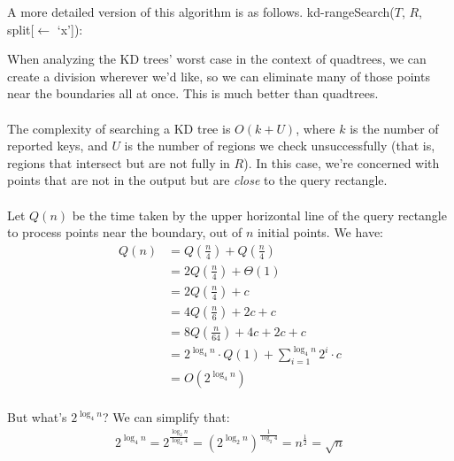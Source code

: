\documentclass[]{article}
\theoremstyle{definition}
\begin{document}
			A more detailed version of this algorithm is as follows. kd-rangeSearch($T$, $R$, split[$\leftarrow$ `x']): \\
			\begin{algorithm}[H]
			\end{algorithm}

			When analyzing the KD trees' worst case in the context of quadtrees, we can create a division wherever we'd like, so we can eliminate many of those points near the boundaries all at once. This is much better than quadtrees.
			\\ \\
			The complexity of searching a KD tree is $O(k + U)$, where $k$ is the number of reported keys, and $U$ is the number of regions we check unsuccessfully (that is, regions that intersect but are not fully in $R$). In this case, we're concerned with points that are not in the output but are \emph{close} to the query rectangle.
			\\ \\
			Let $Q(n)$ be the time taken by the upper horizontal line of the query rectangle to process points near the boundary, out of $n$ initial points. We have:
			\begin{align*}
				Q(n) &= Q\left( \frac{n}{4} \right) + Q\left( \frac{n}{4} \right) \\
				&= 2Q\left( \frac{n}{4} \right) + \Theta(1) \\
				&= 2Q\left( \frac{n}{4} \right) + c \\
				&= 4Q\left( \frac{n}{6} \right) + 2c + c \\
				&= 8Q\left( \frac{n}{64} \right) + 4c + 2c + c \\
				&= 2^{\log_4 n} \cdot Q(1) + \sum_{i = 1}^{\log_4 n} 2^i \cdot c \\
				&= O(2^{\log_4 n}) \\
			\end{align*}

			But what's $2^{\log_4 n}$? We can simplify that:
			\begin{align*}
				2^{\log_4 n} = 2^{\frac{\log_2 n}{\log_2 4}} = \left(2^{\log_2 n} \right)^{\frac{1}{\log_2 4}} = n^{\frac{1}{2}} = \sqrt{n}
			\end{align*}
\end{document}
